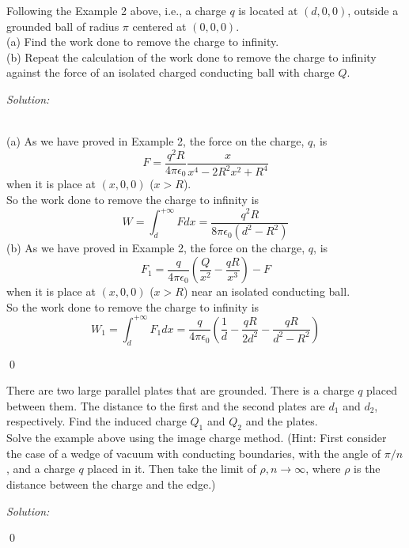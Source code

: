 \documentclass[12pt]{article}
\newenvironment{problem}[2][Problem]{\begin{trivlist}
\item[\hskip \labelsep {\bfseries #1}\hskip \labelsep {\bfseries #2.}]}{\end{trivlist}}
\newenvironment{sol}
    {\emph{Solution:}
    }
    {
    \qed
    }
\begin{document}
\begin{problem}{1}
Following the Example 2 above, i.e., a charge $q$ is located at $(d,0,0)$, outside a grounded ball of radius $\pi$ centered at $(0,0,0)$.\\
(a) Find the work done to remove the charge to infinity.\\
(b) Repeat the calculation of the work done to remove the charge to infinity against the force of an isolated charged conducting ball with charge $Q$.
\end{problem}
\begin{sol}
\\(a) As we have proved in Example 2, the force on the charge, $q$, is
\[
F=\frac{q^2R}{4\pi\epsilon_0}\frac{x}{x^4-2R^2x^2+R^4}
\]
when it is place at $(x,0,0)$ ($x>R$).\\
So the work done to remove the charge to infinity is
\[
W=\int_d^{+\infty}Fdx=\frac{q^2R}{8\pi\epsilon_0(d^2-R^2)}
\]
(b) As we have proved in Example 2, the force on the charge, $q$, is
\[
F_1=\frac{q}{4\pi\epsilon_0}(\frac{Q}{x^2}-\frac{qR}{x^3})-F
\]
when it is place at $(x,0,0)$ ($x>R$) near an isolated conducting ball.\\
So the work done to remove the charge to infinity is
\[
W_1=\int_d^{+\infty}F_1dx=\frac{q}{4\pi\epsilon_0}(\frac{1}{d}-\frac{qR}{2d^2}-\frac{qR}{d^2-R^2})
\]
\end{sol}

\begin{problem}{2}
There are two large parallel plates that are grounded. There is a charge $q$ placed between them. The distance to the first and the second plates are $d_1$ and $d_2$, respectively. Find the induced charge $Q_1$ and $Q_2$ and the plates.\\
Solve the example above using the image charge method. (Hint: First consider the case of a wedge of vacuum with conducting boundaries, with the angle of $\pi/n$, and a charge $q$ placed in it. Then take the limit of $\rho,n\to\infty$, where $\rho$ is the distance between the charge and the edge.)
\end{problem}
\begin{sol}

\end{sol}
\end{document}
